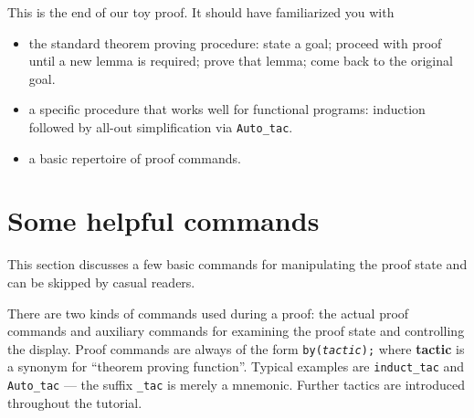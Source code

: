 This is the end of our toy proof. It should have familiarized you with
\begin{itemize}
\item the standard theorem proving procedure:
state a goal; proceed with proof until a new lemma is required; prove that
lemma; come back to the original goal.
\item a specific procedure that works well for functional programs:
induction followed by all-out simplification via \texttt{Auto_tac}.
\item a basic repertoire of proof commands.
\end{itemize}


\section{Some helpful commands}
\label{sec:commands-and-hints}

This section discusses a few basic commands for manipulating the proof state
and can be skipped by casual readers.

There are two kinds of commands used during a proof: the actual proof
commands and auxiliary commands for examining the proof state and controlling
the display. Proof commands are always of the form
\texttt{by(\textit{tactic});} where \textbf{tactic} is a
synonym for ``theorem proving function''. Typical examples are
\texttt{induct_tac} and \texttt{Auto_tac} --- the suffix \texttt{_tac} is
merely a mnemonic. Further tactics are introduced throughout the tutorial.


